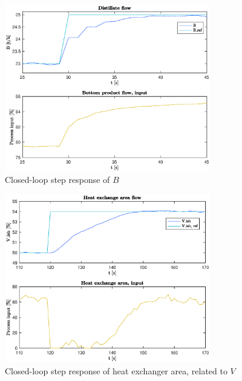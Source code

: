 \documentclass[12pt]{article}
\begin{document}
\begin{figure}[p]
\centering
\includegraphics[width=0.8\textwidth]{../Systemanalyse/Log_Data_to_Matlab/Figurer/Stegeksperimenter/FC1019_step.eps}
\caption{Closed-loop step response of $B$}
\label{fig:cl_step_FC1019}
\end{figure}

\begin{figure}[p]
\centering
\includegraphics[width=0.8\textwidth]{../Systemanalyse/Log_Data_to_Matlab/Figurer/Stegeksperimenter/LC1028_step.eps}
\caption{Closed-loop step response of heat exchanger area, related to $V$}
\label{fig:cl_step_LC1028}
\end{figure}
\end{document}
